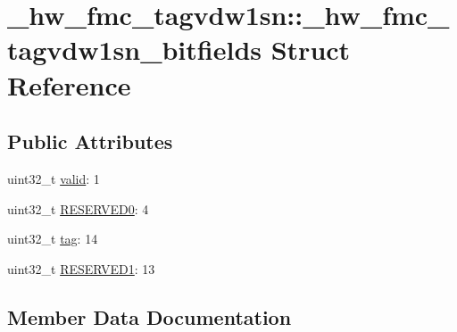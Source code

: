 \hypertarget{struct__hw__fmc__tagvdw1sn_1_1__hw__fmc__tagvdw1sn__bitfields}{}\section{\+\_\+hw\+\_\+fmc\+\_\+tagvdw1sn\+:\+:\+\_\+hw\+\_\+fmc\+\_\+tagvdw1sn\+\_\+bitfields Struct Reference}
\label{struct__hw__fmc__tagvdw1sn_1_1__hw__fmc__tagvdw1sn__bitfields}
\subsection*{Public Attributes}
\begin{DoxyCompactItemize}
\item 
uint32\+\_\+t \hyperlink{struct__hw__fmc__tagvdw1sn_1_1__hw__fmc__tagvdw1sn__bitfields_a0fe02b3f3857373cb2d5c56831259991}{valid}\+: 1
\item 
uint32\+\_\+t \hyperlink{struct__hw__fmc__tagvdw1sn_1_1__hw__fmc__tagvdw1sn__bitfields_a78b4f8638e2ed06d0e05dbc8cc3f938b}{R\+E\+S\+E\+R\+V\+E\+D0}\+: 4
\item 
uint32\+\_\+t \hyperlink{struct__hw__fmc__tagvdw1sn_1_1__hw__fmc__tagvdw1sn__bitfields_a4929bbbc6c718f77c87ef07cced061f9}{tag}\+: 14
\item 
uint32\+\_\+t \hyperlink{struct__hw__fmc__tagvdw1sn_1_1__hw__fmc__tagvdw1sn__bitfields_ae11583e2bf84421f42f7bda7a6e0fd9f}{R\+E\+S\+E\+R\+V\+E\+D1}\+: 13
\end{DoxyCompactItemize}


\subsection{Member Data Documentation}
